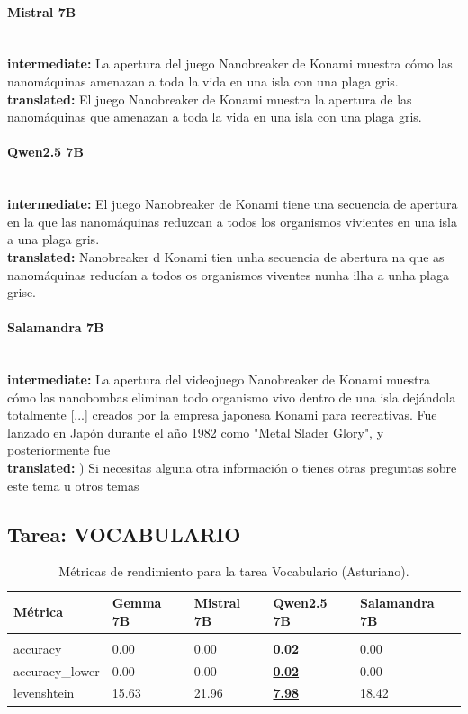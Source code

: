 \paragraph{Mistral 7B}~\\
\textbf{intermediate:} La apertura del juego Nanobreaker de Konami muestra cómo las nanomáquinas amenazan a toda la vida en una isla con una plaga gris.\\
\textbf{translated:} El juego Nanobreaker de Konami muestra la apertura de las nanomáquinas que amenazan a toda la vida en una isla con una plaga gris.

\paragraph{Qwen2.5 7B}~\\
\textbf{intermediate:} El juego Nanobreaker de Konami tiene una secuencia de apertura en la que las nanomáquinas reduzcan a todos los organismos vivientes en una isla a una plaga gris.\\
\textbf{translated:} Nanobreaker d Konami tien unha secuencia de abertura na que as nanomáquinas reducían a todos os organismos viventes nunha ilha a unha plaga grise.

\paragraph{Salamandra 7B}~\\
\textbf{intermediate:} La apertura del videojuego Nanobreaker de Konami muestra cómo las nanobombas eliminan todo organismo vivo dentro de una isla dejándola totalmente  [...]  creados por la empresa japonesa Konami para recreativas. Fue lanzado en Japón durante el año 1982 como "Metal Slader Glory", y posteriormente fue\\
\textbf{translated:} )       Si necesitas alguna otra información o tienes otras preguntas sobre este tema u otros temas

\subsection{Tarea: VOCABULARIO}\label{tarea-vocabulario}
\begin{longtable}[]{@{}lllll@{}}
\toprule\noalign{}
Métrica & Gemma 7B & Mistral 7B & Qwen2.5 7B & Salamandra 7B \\
\midrule\noalign{}
\endhead
\bottomrule\noalign{}
\caption{Métricas de rendimiento para la tarea Vocabulario (Asturiano).}
\label{tab:metricas_vocabulario_Asturiano}\\
\endlastfoot
accuracy & 0.00 & 0.00 & \textbf{\underline{0.02}} & 0.00 \\
accuracy\_lower & 0.00 & 0.00 & \textbf{\underline{0.02}} & 0.00 \\
levenshtein & 15.63 & 21.96 & \textbf{\underline{7.98}} & 18.42 \\
\end{longtable}

